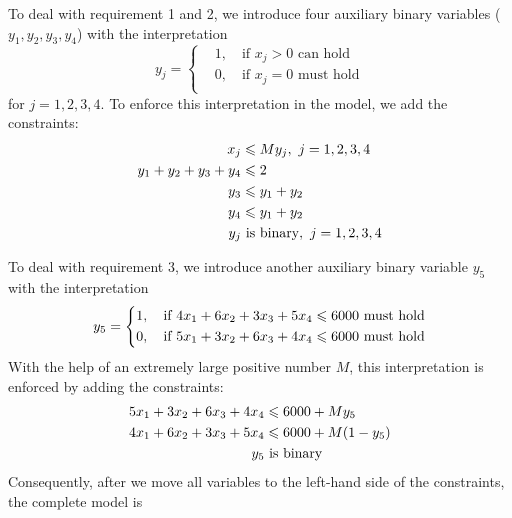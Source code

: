 \documentclass[a4paper]{article}
\begin{document}
\begin{enumerate}
\begin{solution}
	To deal with requirement 1 and 2, we introduce four auxiliary binary variables ($y_1,y_2,y_3,y_4$) with the interpretation
	\begin{equation*}
	y_j=\left\{\begin{aligned}
	&1,\quad\text{if } x_j>0 \text{ can hold} \\
	&0,\quad\text{if } x_j=0 \text{ must hold} \\
	\end{aligned}\right. 
	\end{equation*}
	for $j=1,2,3,4.$ To enforce this interpretation in the model, we add the constraints:
	\begin{equation*}
	\begin{aligned}
	x_j&\leqslant My_j,\ j=1,2,3,4\\
	y_1+y_2+y_3+y_4&\leqslant 2\\
	y_3&\leqslant y_1+y_2\\
	y_4&\leqslant y_1+y_2\\
	y_j&\text{ is binary},\ j=1,2,3,4
	\end{aligned}
	\end{equation*}
	
	To deal with requirement 3, we introduce another auxiliary binary variable $y_5$ with the interpretation
	\begin{equation*}
	y_5=\left\{\begin{aligned}
	&1,\quad\text{if } 4x_1+6x_2+3x_3+5x_4\leqslant 6000 \text{ must hold} \\
	&0,\quad\text{if } 5x_1+3x_2+6x_3+4x_4\leqslant 6000 \text{ must hold} \\
	\end{aligned}\right. 
	\end{equation*}
	With the help of an extremely large positive number $M$, this interpretation is enforced by adding the constraints:
	\begin{equation*}
	\begin{aligned}
		5x_1+3x_2+6x_3+4x_4&\leqslant 6000+My_5\\
		4x_1+6x_2+3x_3+5x_4&\leqslant 6000+M(1-y_5)\\
		y_5 &\text{ is binary}
	\end{aligned}
	\end{equation*}
	Consequently, after we move all variables to the left-hand side of the constraints, the complete model is
	

\end{solution}
\end{enumerate}
\end{document}
